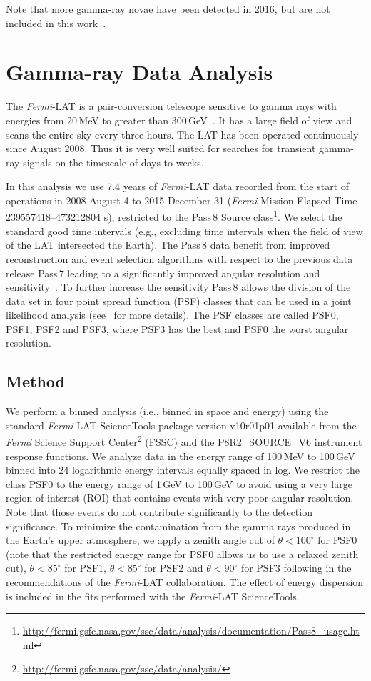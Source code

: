 \documentclass{aa} %
\newcommand{\Fermi}{\textit{Fermi}}
\begin{document}
Note that more gamma-ray novae have been detected in 2016, but are not included in this work~\citep[see e.g.][]{ATel9736,ATel9594}.


\section{Gamma-ray Data Analysis}
\label{sec:gamma}

The \Fermi-LAT is a pair-conversion telescope sensitive to gamma rays with energies from $20\,$MeV to greater than $300\,$GeV~\citep{2009ApJ...697.1071A}. It has a large field of view and scans the entire sky every three hours. The LAT has been operated continuously since August 2008. Thus it is very well suited for searches for transient gamma-ray signals on the timescale of days to weeks. 

In this analysis we use 7.4 years of \Fermi-LAT data recorded from the start of operations in 2008 August 4 to 2015 December 31 (\textit{Fermi} Mission Elapsed Time 239557418--473212804 s),
restricted to the Pass\,8 Source class\footnote{\url{
http://fermi.gsfc.nasa.gov/ssc/data/analysis/documentation/Pass8_usage.html}}. We select the standard good time intervals (e.g., excluding time intervals when the field of view of the LAT intersected the Earth). The Pass\,8 data benefit from improved reconstruction and event selection algorithms with respect to the previous data release Pass\,7 leading to a significantly improved angular resolution and sensitivity~\citep{2013arXiv1303.3514A}. To further increase the sensitivity Pass\,8 allows the division of the data set in four point spread function (PSF) classes that can be used in a joint likelihood analysis (see~\citet{2015arXiv150302641F} for more details). The PSF classes are called PSF0, PSF1, PSF2 and PSF3, where PSF3 has the best and PSF0 the worst angular resolution. 


\subsection{Method}
We perform a binned analysis (i.e., binned in space and energy) using the standard \Fermi-LAT ScienceTools package version v10r01p01 available from the \textit{Fermi} Science Support Center\footnote{\url{http://fermi.gsfc.nasa.gov/ssc/data/analysis/}} (FSSC) and the P8R2\_SOURCE\_V6 instrument response functions. We analyze data in the energy range of 100\,MeV to 100\,GeV binned into 24 logarithmic energy intervals equally spaced in log. We restrict the class PSF0 to the energy range of 1\,GeV to 100\,GeV to avoid using a very large region of interest (ROI) that contains events with very poor angular resolution. Note that those events do not contribute significantly to the detection significance. To minimize the contamination from the gamma rays produced in the Earth's upper atmosphere, we apply a zenith angle cut of $\theta<100^\circ$ for PSF0 (note that the restricted energy range for PSF0 allows us to use a relaxed zenith cut), $\theta<85^\circ$ for PSF1, $\theta<85^\circ$ for PSF2 and $\theta<90^\circ$ for PSF3 following in the recommendations of the \Fermi-LAT collaboration. The effect of energy dispersion is included in the fits performed with the \Fermi-LAT ScienceTools.
\end{document}

